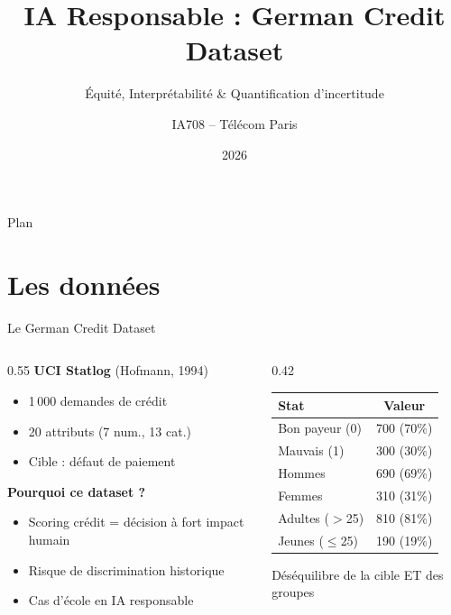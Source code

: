 \documentclass[aspectratio=169, 11pt]{beamer}
\title{IA Responsable : German Credit Dataset}
\subtitle{\'Equit\'e, Interpr\'etabilit\'e \& Quantification d'incertitude}
\author{IA708 -- T\'el\'ecom Paris}
\date{2026}
\begin{document}
\begin{frame}
\titlepage
\end{frame}

\begin{frame}{Plan}
\tableofcontents
\end{frame}

\section{Les donn\'ees}

\begin{frame}{Le German Credit Dataset}
\begin{columns}[T]
\begin{column}{0.55\textwidth}
\textbf{UCI Statlog} (Hofmann, 1994)
\begin{itemize}
    \item 1\,000 demandes de cr\'edit
    \item 20 attributs (7 num., 13 cat.)
    \item Cible : d\'efaut de paiement
\end{itemize}

\vspace{0.5em}
\textbf{Pourquoi ce dataset ?}
\begin{itemize}
    \item Scoring cr\'edit = d\'ecision \`a fort impact humain
    \item Risque de discrimination historique
    \item Cas d'\'ecole en IA responsable
\end{itemize}
\end{column}
\begin{column}{0.42\textwidth}
\centering
\small
\begin{tabular}{lc}
\toprule
\textbf{Stat} & \textbf{Valeur} \\
\midrule
Bon payeur (0) & 700 (70\%) \\
Mauvais (1) & 300 (30\%) \\
\midrule
Hommes & 690 (69\%) \\
Femmes & 310 (31\%) \\
\midrule
Adultes ($>$25) & 810 (81\%) \\
Jeunes ($\leq$25) & 190 (19\%) \\
\bottomrule
\end{tabular}

\vspace{0.5em}
\scriptsize D\'es\'equilibre de la cible ET des groupes
\end{column}
\end{columns}
\end{frame}
\end{document}
